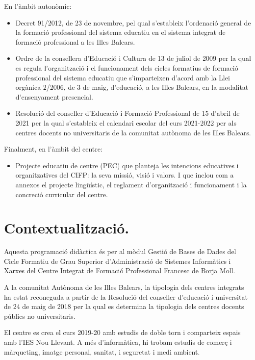 \documentclass[catalan, a4paper, 12pt, titlepage]{article}
\begin{document}
En l'àmbit autonòmic:
\begin{itemize}
	\item Decret 91/2012, de 23 de novembre, pel qual s'estableix l'ordenació general de la formació professional del sistema educatiu en el sistema integrat de formació professional a les Illes Balears.
	\item Ordre de la consellera d'Educació i Cultura de 13 de juliol de 2009 per la qual es regula l'organització i el funcionament dels cicles formatius de formació professional del sistema educatiu que s'imparteixen d'acord amb la Llei orgànica 2/2006, de 3 de maig, d'educació, a les Illes Balears, en la modalitat d'ensenyament presencial.
	\item Resolució del conseller d’Educació i Formació Professional de 15 d’abril de 2021 per la qual s’estableix el calendari escolar del curs 2021-2022 per als centres docents no universitaris de la comunitat autònoma de les Illes Balears.
\end{itemize}

Finalment, en l'àmbit del centre:
\begin{itemize}
	\item Projecte educatiu de centre (PEC) que planteja les intencions educatives i organitzatives del CIFP: la seva missió, visió i valors. I que inclou com a annexos el projecte lingüístic, el reglament d'organització i funcionament i la concreció curricular del centre.
\end{itemize}

\section{Contextualització.}
\label{sec:contextualització}

Aquesta programació didàctica és per al mòdul Gestió de Bases de Dades del Cicle Formatiu de Grau Superior d'Administració de Sistemes Informàtics i Xarxes del Centre Integrat de Formació Professional Francesc de Borja Moll. 

A la comunitat Autònoma de les Illes Balears, la tipologia dels centres integrats ha estat reconeguda a partir de la Resolució del conseller d'educació i universitat de 24 de maig de 2018 per la qual es determina la tipologia dels centres docents públics no universitaris.

El centre es crea el curs 2019-20 amb estudis de doble torn i comparteix espais amb l'IES Nou Llevant. A més d'informàtica, hi trobam estudis de comerç i màrqueting, imatge personal, sanitat, i seguretat i medi ambient.
\end{document}
